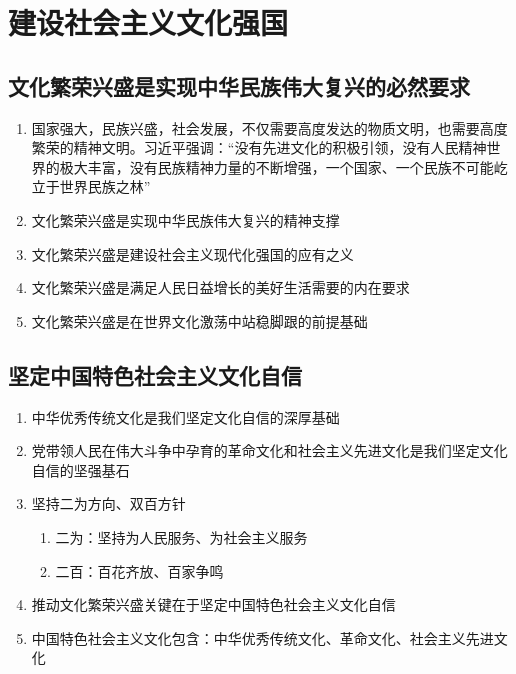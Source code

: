 \documentclass{ctexart}
\numberwithin{figure}{section}
\numberwithin{equation}{section}
\begin{document}
\section{建设社会主义文化强国}
    \begin{tcolorbox}[colback=blue!5!white]
    \subsection{文化繁荣兴盛是实现中华民族伟大复兴的必然要求}     
        \begin{enumerate}
            \item 国家强大，民族兴盛，社会发展，不仅需要高度发达的物质文明，也需要高度繁荣的精神文明。习近平强调：“没有先进文化的积极引领，没有人民精神世界的极大丰富，没有民族精神力量的不断增强，一个国家、一个民族不可能屹立于世界民族之林”
            \item 文化繁荣兴盛是实现中华民族伟大复兴的精神支撑
            \item 文化繁荣兴盛是建设社会主义现代化强国的应有之义
            \item 文化繁荣兴盛是满足人民日益增长的美好生活需要的内在要求
            \item 文化繁荣兴盛是在世界文化激荡中站稳脚跟的前提基础
        \end{enumerate}
        \end{tcolorbox}
    \subsection{坚定中国特色社会主义文化自信}
        \begin{enumerate}
            \item 中华优秀传统文化是我们坚定文化自信的深厚基础
            \item 党带领人民在伟大斗争中孕育的革命文化和社会主义先进文化是我们坚定文化自信的坚强基石
            \item 坚持二为方向、双百方针
            \begin{enumerate}
                \item 二为：坚持为人民服务、为社会主义服务
                \item 二百：百花齐放、百家争鸣
            \end{enumerate}
            \item  推动文化繁荣兴盛关键在于坚定中国特色社会主义文化自信
            \item 中国特色社会主义文化包含：中华优秀传统文化、革命文化、社会主义先进文化
        \end{enumerate}
\end{document}
